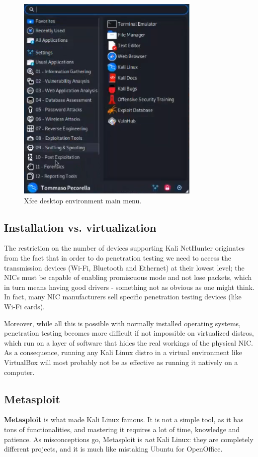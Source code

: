 \begin{figure}[h]
    \centering
    \includegraphics[scale=1]{img/xfce.png}
    \decoRule
    \caption{Xfce desktop environment main menu.}
    \label{fig:xfce}
\end{figure}


\subsection{Installation vs. virtualization}
The restriction on the number of devices supporting Kali NetHunter originates from the fact that in order to do penetration testing we need to access the transmission devices (Wi-Fi, Bluetooth and Ethernet) at their lowest level; the NICs must be capable of enabling promiscuous mode and not lose packets, which in turn means having good drivers - something not as obvious as one might think. In fact, many NIC manufacturers sell specific penetration testing devices (like Wi-Fi cards).

Moreover, while all this is possible with normally installed operating systems, penetration testing becomes more difficult if not impossible on virtualized distros, which run on a layer of software that hides the real workings of the physical NIC. As a consequence, running any Kali Linux distro in a virtual environment like VirtualBox will most probably not be as effective as running it natively on a computer.


\subsection{Metasploit}
\textbf{Metasploit} is what made Kali Linux famous. It is not a simple tool, as it has tons of functionalities, and mastering it requires a lot of time, knowledge and patience. As misconceptions go, Metasploit is \textit{not} Kali Linux: they are completely different projects, and it is much like mistaking Ubuntu for OpenOffice.

